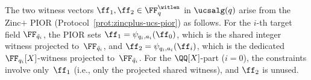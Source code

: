 \begin{remark}
\label{rem:ucsalg-witness-mapping}
The two witness vectors $\ff_1,\ff_2\in\FF_q^{\witlen}$ in $\ucsalg(q)$ arise from the Zinc$+$ PIOR (Protocol~\ref{prot:zincplus-ucs-pior}) as follows.  For the $i$-th target field $\FF_{\tilde{q}_i}$, the PIOR sets $\ff_1 = \psi_{q_i,a_i}(\ff_0)$, which is the shared integer witness projected to~$\FF_{\tilde{q}_i}$, and $\ff_2 = \psi_{q_i,a_i}(\ff_i)$, which is the dedicated $\FF_{q_i}[X]$-witness projected to~$\FF_{\tilde{q}_i}$. For the $\QQ[X]$-part ($i=0$), the constraints involve only~$\ff_1$ (i.e., only the projected shared witness), and $\ff_2$ is unused.
\end{remark}